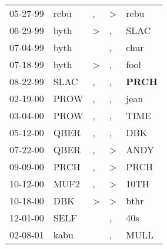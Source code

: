 \begin{supertabular}{p{0.07\textwidth}p{0.06\textwidth}p{0.02\textwidth}p{0.02\textwidth}p{0.06\textwidth}}
          05-27-99\textsuperscript{} &           rebu\textsuperscript{} &                , &     \textgreater &           rebu\textsuperscript{} \\
          06-29-99\textsuperscript{} &           byth\textsuperscript{} &     \textgreater &                , &           SLAC\textsuperscript{} \\
          07-04-99\textsuperscript{} &           byth\textsuperscript{} &                  &                , &           chur\textsuperscript{} \\
          07-18-99\textsuperscript{} &           byth\textsuperscript{} &     \textgreater &                , &           fool\textsuperscript{} \\
          08-22-99\textsuperscript{} &           SLAC\textsuperscript{} &                , &                , &  \textbf{PRCH\textsuperscript{}} \\
          02-19-00\textsuperscript{} &           PROW\textsuperscript{} &                , &                , &           jean\textsuperscript{} \\
          03-04-00\textsuperscript{} &           PROW\textsuperscript{} &                , &                , &           TIME\textsuperscript{} \\
          05-12-00\textsuperscript{} &           QBER\textsuperscript{} &                , &                , &            DBK\textsuperscript{} \\
          07-22-00\textsuperscript{} &           QBER\textsuperscript{} &                , &     \textgreater &           ANDY\textsuperscript{} \\
          09-09-00\textsuperscript{} &           PRCH\textsuperscript{} &                , &     \textgreater &           PRCH\textsuperscript{} \\
          10-12-00\textsuperscript{} &           MUF2\textsuperscript{} &                , &     \textgreater &           10TH\textsuperscript{} \\
          10-18-00\textsuperscript{} &            DBK\textsuperscript{} &     \textgreater &     \textgreater &           bthr\textsuperscript{} \\
          12-01-00\textsuperscript{} &           SELF\textsuperscript{} &                  &                , &            40s\textsuperscript{} \\
          02-08-01\textsuperscript{} &           kabu\textsuperscript{} &                  &                , &           MULL\textsuperscript{} \\

\end{supertabular}
